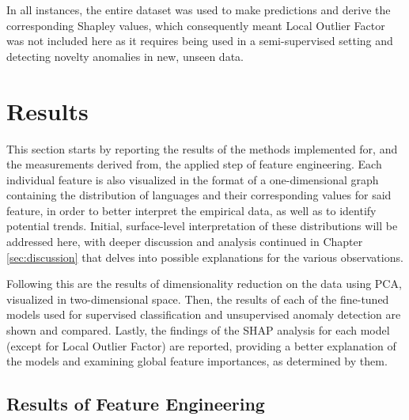 \documentclass[12pt,a4paper]{article}
\numberwithin{figure}{section}
\numberwithin{table}{section}
\numberwithin{definition}{section}
\begin{document}
In all instances, the entire dataset was used to make predictions and derive the corresponding Shapley values, which consequently meant Local Outlier Factor was not included here as it requires being used in a semi-supervised setting and detecting novelty anomalies in new, unseen data. 

\newpage
\section{Results}
\label{sec:results}

This section starts by reporting the results of the methods implemented for, and the measurements derived from, the applied step of feature engineering. Each individual feature is also visualized in the format of a one-dimensional graph containing the distribution of languages and their corresponding values for said feature, in order to better interpret the empirical data, as well as to identify potential trends. Initial, surface-level interpretation of these distributions will be addressed here, with deeper discussion and analysis continued in Chapter \ref{sec:discussion} that delves into possible explanations for the various observations.

Following this are the results of dimensionality reduction on the data using PCA, visualized in two-dimensional space. Then, the results of each of the fine-tuned models used for supervised classification and unsupervised anomaly detection are shown and compared. Lastly, the findings of the SHAP analysis for each model (except for Local Outlier Factor) are reported, providing a better explanation of the models and examining global feature importances, as determined by them.

\subsection{Results of Feature Engineering}
\label{ssec:featureengineeringresults}

\end{document}
